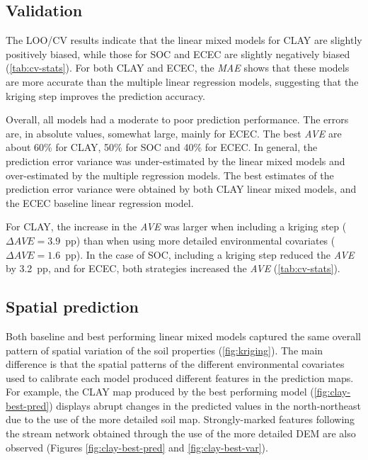 \subsection{Validation}

The LOO\-/CV results indicate that the linear mixed models for CLAY are slightly positively biased, while 
those for SOC and ECEC are slightly negatively biased (\autoref{tab:cv-stats}). For both CLAY and ECEC, the 
\textit{MAE} shows that these models are more accurate than the multiple linear regression models, suggesting 
that the kriging step improves the prediction accuracy.



Overall, all models had a moderate to poor prediction performance. The errors are, in absolute values, somewhat 
large, mainly for ECEC. The best \textit{AVE} are about 60\% for CLAY, 50\% for SOC and 40\% for ECEC. In 
general, the prediction error variance was under-estimated by the linear mixed models and over-estimated by the 
multiple regression models. The best estimates of the prediction error variance were obtained by both CLAY 
linear mixed models, and the ECEC baseline linear regression model.

For CLAY, the increase in the \textit{AVE} was larger when including a kriging step 
($\Delta\textit{AVE}=3.9$~pp) than when using more detailed environmental covariates 
($\Delta\textit{AVE}=1.6$~pp). In the case of SOC, including a kriging step reduced the \textit{AVE} by 3.2~pp, 
and for ECEC, both strategies increased the \textit{AVE} (\autoref{tab:cv-stats}).

\subsection{Spatial prediction}

Both baseline and best performing linear mixed models captured the same overall pattern of spatial variation of 
the soil properties (\autoref{fig:kriging}). The main difference is that the spatial patterns of the different 
environmental covariates used to calibrate each model produced different features in the prediction maps. For 
example, the CLAY map produced by the best performing model (\autoref{fig:clay-best-pred}) displays abrupt 
changes in the predicted values in the north-northeast due to the use of the more detailed soil map. 
Strongly-marked features following the stream network obtained through the use of the more detailed DEM are 
also observed (Figures \ref{fig:clay-best-pred} and \ref{fig:clay-best-var}).

